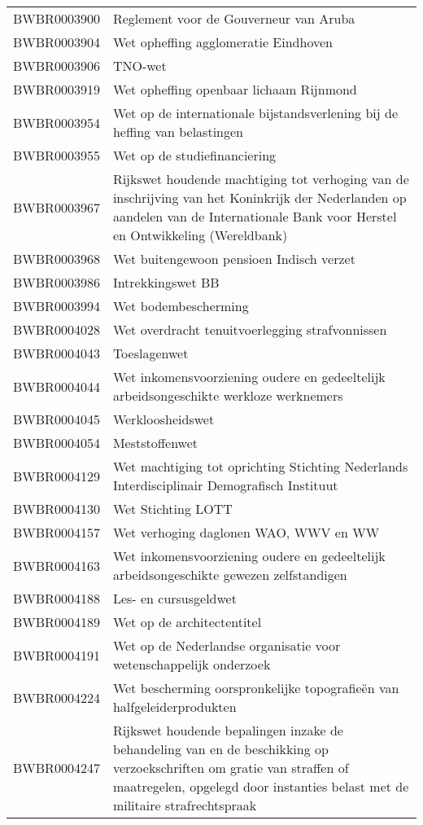\begin{longtable}{lp{}}
BWBR0003900 & Reglement voor de Gouverneur van Aruba \\
BWBR0003904 & Wet opheffing agglomeratie Eindhoven \\
BWBR0003906 & TNO-wet \\
BWBR0003919 & Wet opheffing openbaar lichaam Rijnmond  \\
BWBR0003954 & Wet op de internationale bijstandsverlening bij de heffing van belastingen \\
BWBR0003955 & Wet op de studiefinanciering \\
BWBR0003967 & Rijkswet houdende machtiging tot verhoging van de inschrijving van het Koninkrijk der Nederlanden op aandelen van de Internationale Bank voor Herstel en Ontwikkeling (Wereldbank) \\
BWBR0003968 & Wet buitengewoon pensioen Indisch verzet \\
BWBR0003986 & Intrekkingswet BB \\
BWBR0003994 & Wet bodembescherming \\
BWBR0004028 & Wet overdracht tenuitvoerlegging strafvonnissen \\
BWBR0004043 & Toeslagenwet \\
BWBR0004044 & Wet inkomensvoorziening oudere en gedeeltelijk arbeidsongeschikte werkloze werknemers \\
BWBR0004045 & Werkloosheidswet \\
BWBR0004054 & Meststoffenwet \\
BWBR0004129 & Wet machtiging tot oprichting Stichting Nederlands Interdisciplinair Demografisch Instituut \\
BWBR0004130 & Wet Stichting LOTT \\
BWBR0004157 & Wet verhoging daglonen WAO, WWV en WW \\
BWBR0004163 & Wet inkomensvoorziening oudere en gedeeltelijk arbeidsongeschikte gewezen zelfstandigen \\
BWBR0004188 & Les- en cursusgeldwet \\
BWBR0004189 & Wet op de architectentitel \\
BWBR0004191 & Wet op de Nederlandse organisatie voor wetenschappelijk onderzoek \\
BWBR0004224 & Wet bescherming oorspronkelijke topografieën van halfgeleiderprodukten \\
BWBR0004247 & Rijkswet houdende bepalingen inzake de behandeling van en de beschikking op verzoekschriften om gratie van straffen of maatregelen, opgelegd door instanties belast met de militaire strafrechtspraak \\

\end{longtable}
